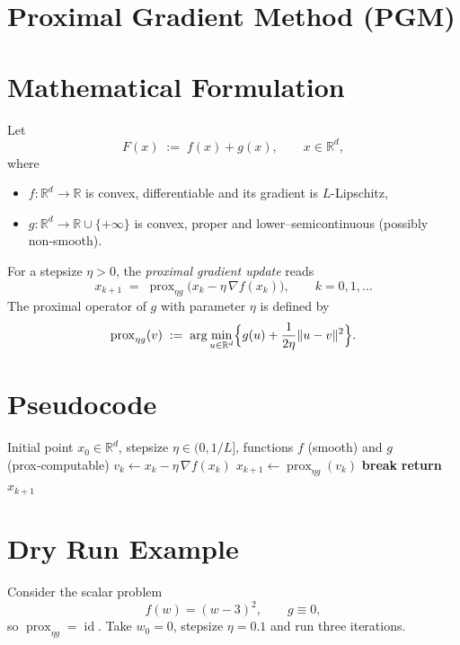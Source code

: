 \documentclass{article}
\newcommand{\prox}{\operatorname{prox}}
\newcommand{\grad}{\nabla}
\newcommand{\R}{\mathbb{R}}
\begin{document}
\section*{Proximal Gradient Method (PGM)}

\section*{Mathematical Formulation}
Let  
\[
F(x)\;:=\;f(x)+g(x),\qquad x\in\R^{d},
\]
where  

\begin{itemize}[nosep]
\item $f:\R^{d}\to\R$ is convex, differentiable and its gradient is $L$-Lipschitz,
\item $g:\R^{d}\to\R\cup\{+\infty\}$ is convex, proper and lower–semicontinuous (possibly non‑smooth).
\end{itemize}
For a stepsize $\eta>0$, the \emph{proximal gradient update} reads
\begin{equation}
\label{eq:update}
x_{k+1}\;=\;\prox_{\eta g}\!\bigl(x_{k}-\eta\,\grad f(x_{k})\bigr),\qquad k=0,1,\dots
\end{equation}
The proximal operator of $g$ with parameter $\eta$ is defined by
\[
\prox_{\eta g}(v)\;:=\;\arg\min_{u\in\R^{d}}\Bigl\{ g(u)+\frac{1}{2\eta}\|u-v\|^{2}\Bigr\}.
\]

\section*{Pseudocode}
\begin{algorithm}[H]
\caption{Proximal Gradient Method}
\begin{algorithmic}[1]
\Require Initial point $x_{0}\in\R^{d}$, stepsize $\eta\in(0,1/L]$,
        functions $f$ (smooth) and $g$ (prox‑computable)
    \State $v_{k}\gets x_{k}-\eta\,\grad f(x_{k})$ \hfill{}
    \State $x_{k+1}\gets \prox_{\eta g}(v_{k})$ \hfill{}
        \State \textbf{break}
    \EndIf
\EndFor
\State \textbf{return} $x_{k+1}$
\end{algorithmic}
\end{algorithm}

\section*{Dry Run Example}
Consider the scalar problem
\[
f(w)=(w-3)^{2},\qquad g\equiv0,
\]
so $\prox_{\eta g}= \operatorname{id}$.  
Take $w_{0}=0$, stepsize $\eta=0.1$ and run three iterations.
\end{document}
